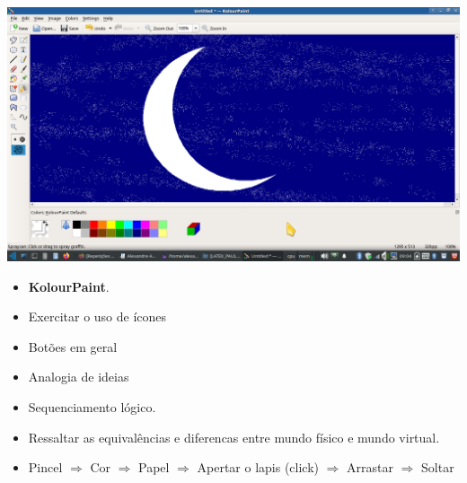 \begin{center}
	\includegraphics[width=\linewidth]{./IMG/Screenshot_20221101_090407.png}
\end{center}

\begin{itemize}
	\item \textbf{KolourPaint}.
	\item Exercitar o uso de ícones
	\item Botões em geral
	\item Analogia de ideias
	\item Sequenciamento lógico.
	\item Ressaltar as equivalências e diferencas entre mundo físico e mundo virtual.
	\item Pincel $\Rightarrow$ Cor $\Rightarrow$ Papel $\Rightarrow$ Apertar o lapis (click) $\Rightarrow$ Arrastar $\Rightarrow$ Soltar
\end{itemize}

